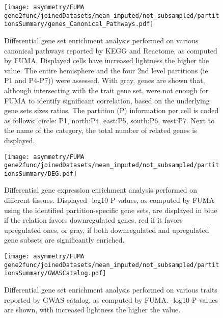 \begin{figure}[H]
	
	\begin{adjustwidth}{-3cm}{-2.5cm}
	\centering
	\texttt{[image: asymmetry/FUMA gene2func/joinedDatasets/mean\_imputed/not\_subsampled/partitionsSummary/genes\_Canonical\_Pathways.pdf]}
	
	\caption[Canonical pathways GSEA genes]{Differential gene set enrichment analysis performed on various canonical pathways reported by KEGG and Reactome, as computed by FUMA. Displayed cells have increased lightness the higher the value. The entire hemisphere and the four 2nd level partitions (ie. P1 and P4-P7)) were assessed. With gray, genes are shown that, although intersecting with the trait gene set, were not enough for FUMA to identify significant correlation, based on the underlying gene sets sizes ratios. The partition (P) information per cell is coded as follows: circle: P1, north:P4, east:P5, south:P6, west:P7. Next to the name of the category, the total number of related genes is displayed.}
	\label{fig:can_pathways_genes}
	
\end{adjustwidth}
\end{figure}
\begin{figure}[H]
	\centering
	\texttt{[image: asymmetry/FUMA gene2func/joinedDatasets/mean\_imputed/not\_subsampled/partitionsSummary/DEG.pdf]}
	
	\caption[Differential gene expression enrichment analysis]{Differential gene expression enrichment analysis performed on different tissues. Displayed -log10 P-values, as computed by FUMA using the identified partition-specific gene sets, are displayed in blue if the relation favors downregulated genes, red if it favors upregulated ones, or gray, if both downregulated and upregulated gene subsets are significantly enriched.}
	\label{fig:de_genes}
\end{figure}
\begin{figure}[H]
	\centering
	\texttt{[image: asymmetry/FUMA gene2func/joinedDatasets/mean\_imputed/not\_subsampled/partitionsSummary/GWASCatalog.pdf]}
	
	\caption[GWAS Catalog GSEA -log10P values]{Differential gene set enrichment analysis performed on various traits reported by GWAS catalog, as computed by FUMA. -log10 P-values are shown, with increased lightness the higher the value.}
	\label{fig:gw_catalog}
\end{figure}
